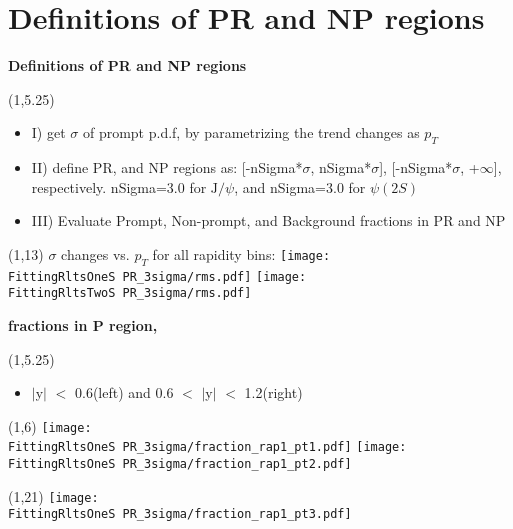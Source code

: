 \documentclass[11pt,slidescentered,red,compress,handout,hyperref={bookmarks=true},mathseriftable]{beamer}
\newcommand{\Jpsi}{\mathrm{J}/\psi}
\newcommand{\FittingRltsOneS}{../Psi1S/Fit/parameter/evaluateCtau/}
\newcommand{\FittingRltsTwoS}{../Psi2S/Fit/parameter/evaluateCtau/}
\begin{document}
%

\section{Definitions of PR and NP regions } 
\begin{frame}[t]{\small \bf Definitions of PR and NP regions }{}
\begin{textblock}{48}(1,5.25)
\begin{itemize}
\scriptsize \item I) get $\sigma$ of prompt p.d.f, by parametrizing the trend changes as $p_{T}$
\scriptsize \item II) define PR, and NP regions as: [-nSigma*$\sigma$, nSigma*$\sigma$], [-nSigma*$\sigma$, +$\infty$], respectively.
nSigma=3.0 for $\Jpsi$, and nSigma=3.0 for $\psi(2S)$
\scriptsize \item III) Evaluate Prompt, Non-prompt, and Background fractions in PR and NP
\end{itemize}
\end{textblock}
\begin{textblock}{48}(1,13)
\scriptsize $\sigma$ changes vs. $p_{T}$ for all rapidity bins: 
\hspace*{10pt} \texttt{[image: \\FittingRltsOneS PR\_3sigma/rms.pdf]}
\hspace*{10pt} \texttt{[image: \\FittingRltsTwoS PR\_3sigma/rms.pdf]}
\end{textblock}
\end{frame}

\begin{frame}[t]{\small \bf fractions in P region,  }{}
\begin{textblock}{48}(1,5.25)
\begin{itemize}
\scriptsize \item  $|$y$|$ $<$ 0.6(left) and 0.6 $<$ $|$y$|$ $<$ 1.2(right)
\end{itemize}
\end{textblock}
\begin{textblock}{48}(1,6)
\hspace*{10pt} \texttt{[image: \\FittingRltsOneS PR\_3sigma/fraction\_rap1\_pt1.pdf]}
\hspace*{10pt} \texttt{[image: \\FittingRltsOneS PR\_3sigma/fraction\_rap1\_pt2.pdf]}
\begin{textblock}{48}(1,21)
\hspace*{10pt} \texttt{[image: \\FittingRltsOneS PR\_3sigma/fraction\_rap1\_pt3.pdf]}
\end{textblock}
\end{textblock}
\end{frame}
\end{document}
